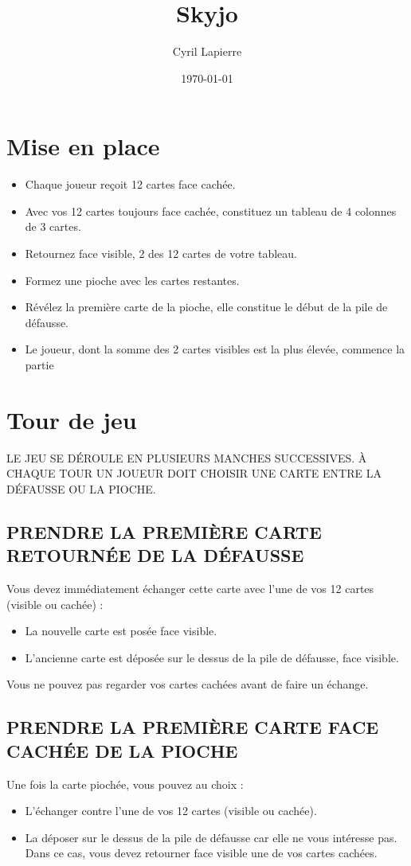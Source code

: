 \documentclass{article}%
\title{Skyjo}%
\author{Cyril Lapierre}%
\date{\today}%
\begin{document}
%
\pagestyle{empty}%
\normalsize%
\maketitle%
\section{ Mise en place
}%
\label{sec:Miseenplace}%
\begin{itemize}%
\item%
%
 Chaque joueur reçoit 12 cartes face cachée.
%
\item%
%
 Avec vos 12 cartes toujours face cachée, constituez un tableau de 4 colonnes de 3 cartes.
%
\item%
%
 Retournez face visible, 2 des 12 cartes de votre tableau.
%
\item%
%
 Formez une pioche avec les cartes restantes.
%
\item%
%
 Révélez la première carte de la pioche, elle constitue le début de la pile de défausse.
%
\item%
%
 Le joueur, dont la somme des 2 cartes visibles est la plus élevée, commence la partie
%
\end{itemize}

%
\section{ Tour de jeu
}%
\label{sec:Tourdejeu}%
LE JEU SE DÉROULE EN PLUSIEURS MANCHES SUCCESSIVES. À CHAQUE TOUR UN JOUEUR DOIT CHOISIR UNE CARTE ENTRE LA DÉFAUSSE OU LA PIOCHE.


%
\subsection{ PRENDRE LA PREMIÈRE CARTE RETOURNÉE DE LA DÉFAUSSE
}%
\label{subsec:PRENDRELAPREMIRECARTERETOURNEDELADFAUSSE}%
Vous devez immédiatement échanger cette carte avec l’une de vos 12 cartes (visible ou cachée) :
%
\begin{itemize}%
\item%
%
 La nouvelle carte est posée face visible.
%
\item%
%
 L'ancienne carte est déposée sur le dessus de la pile de défausse, face visible.
%
\end{itemize}%
Vous ne pouvez pas regarder vos cartes cachées avant de faire un échange.


%
\subsection{ PRENDRE LA PREMIÈRE CARTE FACE CACHÉE DE LA PIOCHE
}%
\label{subsec:PRENDRELAPREMIRECARTEFACECACHEDELAPIOCHE}%
Une fois la carte piochée, vous pouvez au choix :
%
\begin{itemize}%
\item%
%
 L'échanger contre l'une de vos 12 cartes (visible ou cachée).
%
\item%
%
 La déposer sur le dessus de la pile de défausse car elle ne vous intéresse pas. Dans ce cas, vous devez retourner face visible une de vos cartes cachées.
%
\end{itemize}
\end{document}
